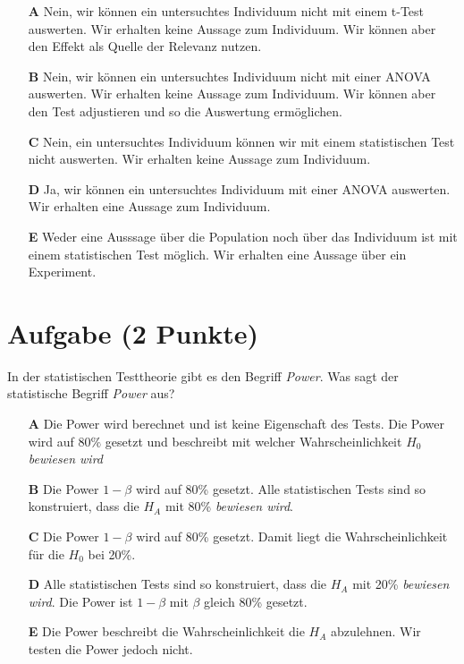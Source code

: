 \documentclass[a4paper, 9pt]{scrartcl}\usepackage[]{graphicx}\usepackage[]{xcolor}
\begin{document}
\begin{enumerate}
\item [\textbf{A} \msquare] Nein, wir können ein untersuchtes Individuum nicht mit einem t-Test auswerten. Wir erhalten keine Aussage zum Individuum. Wir können aber den Effekt als Quelle der Relevanz nutzen.
\item [\textbf{B} \msquare] Nein, wir können ein untersuchtes Individuum nicht mit einer ANOVA auswerten. Wir erhalten keine Aussage zum Individuum. Wir können aber den Test adjustieren und so die Auswertung ermöglichen.
\item [\textbf{C} \msquare] Nein, ein untersuchtes Individuum können wir mit einem statistischen Test nicht auswerten. Wir erhalten keine Aussage zum Individuum.
\item [\textbf{D} \msquare] Ja, wir können ein untersuchtes Individuum mit einer ANOVA auswerten. Wir erhalten eine Aussage zum Individuum.
\item [\textbf{E} \msquare] Weder eine Ausssage über die Population noch über das Individuum ist mit einem statistischen Test möglich. Wir erhalten eine Aussage über ein Experiment.
\end{enumerate}

\section{Aufgabe \hfill (2 Punkte)}



In der statistischen Testtheorie gibt es den Begriff \textit{Power}. Was sagt der statistische Begriff \textit{Power} aus?



\begin{enumerate}
\item [\textbf{A} \msquare] Die Power wird berechnet und ist keine Eigenschaft des Tests. Die Power wird auf $80\%$ gesetzt und beschreibt mit welcher Wahrscheinlichkeit $H_0$ \textit{bewiesen wird}
\item [\textbf{B} \msquare] Die Power $1-\beta$ wird auf 80\% gesetzt. Alle statistischen Tests sind so konstruiert, dass die $H_A$ mit 80\% \textit{bewiesen wird}.
\item [\textbf{C} \msquare] Die Power $1-\beta$ wird auf 80\% gesetzt. Damit liegt die Wahrscheinlichkeit für die $H_0$ bei 20\%.
\item [\textbf{D} \msquare] Alle statistischen Tests sind so konstruiert, dass die $H_A$ mit 20\% \textit{bewiesen wird}. Die Power ist $1-\beta$ mit $\beta$ gleich 80\% gesetzt.
\item [\textbf{E} \msquare] Die Power beschreibt die Wahrscheinlichkeit die $H_A$ abzulehnen. Wir testen die Power jedoch nicht.
\end{enumerate}
\end{document}
